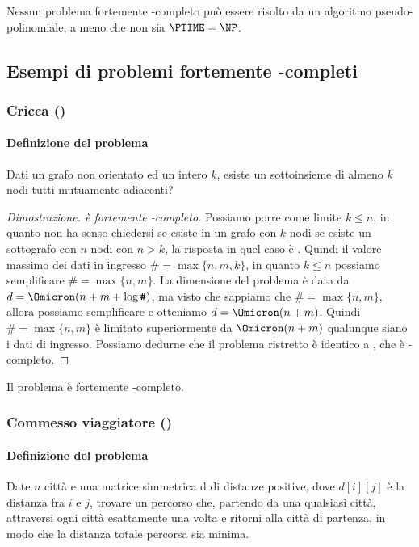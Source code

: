 \begin{theorem*}
Nessun problema fortemente \NP-completo può essere risolto da un algoritmo pseudo-polinomiale, a meno che non sia \(\PTIME = \NP\).
\end{theorem*}

\subsection{Esempi di problemi fortemente \NP-completi}

\subsubsection{Cricca (\cliqueProblem)}

\paragraph{Definizione del problema}
Dati un grafo non orientato ed un intero \(k\), esiste un sottoinsieme di almeno \(k\) nodi tutti mutuamente adiacenti?

\begin{proof}[Dimostrazione. {\cliqueProblem} è fortemente \NP-completo]
Possiamo porre come limite \(k \leqslant n\), in quanto non ha senso chiedersi se esiste in un grafo con \(k\) nodi se esiste un sottografo con \(n\) nodi con \(n > k\), la risposta in quel caso è \False.
Quindi il valore massimo dei dati in ingresso \(\texttt{\#} = \max\{n,m,k\}\), in quanto \(k \leqslant n\) possiamo semplificare \(\texttt{\#} = \max\{n,m\}\).
La dimensione del problema è data da \(d = \Omicron(n + m + \log\texttt{\#})\), ma visto che sappiamo che \(\texttt{\#} = \max\{n,m\}\), allora possiamo semplificare e otteniamo \(d = \Omicron(n + m)\).
Quindi \(\texttt{\#} = \max\{n, m\}\) è limitato superiormente da \(\Omicron(n + m)\) qualunque siano i dati di ingresso.
Possiamo dedurne che il problema ristretto è identico a {\cliqueProblem}, che è \NP-completo.
\end{proof}

\begin{note}
Il problema {\cliqueProblem} è fortemente \NP-completo.
\end{note}

\subsubsection{Commesso viaggiatore (\tsp)}

\paragraph{Definizione del problema}
Date \(n\) città e una matrice simmetrica d di distanze positive, dove \(d[i][j]\) è la distanza fra \(i\) e \(j\), trovare un percorso che, partendo da una qualsiasi città, attraversi ogni città esattamente una volta e ritorni alla città di partenza, in modo che la distanza totale percorsa sia minima.

